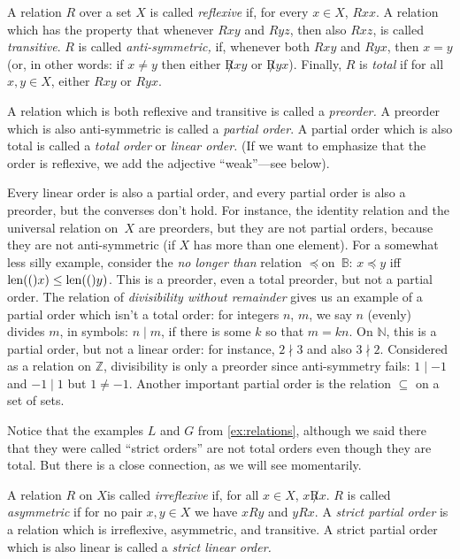 \documentclass[misc]{subfiles}
\begin{document}
\begin{defn}
A relation $R$ over a set $X$ is called \emph{reflexive} if, for
every $x\in X$, $Rxx$. A relation which has the property that whenever
$Rxy$ and $Ryz$, then also $Rxz$, is called \emph{transitive}.
$R$ is called \emph{anti-symmetric,} if, whenever both $Rxy$ and
$Ryx$, then $x=y$ (or, in other words: if $x\neq y$ then either
$\not Rxy$ or $\not Ryx$). Finally, $R$ is \emph{total} if for
all $x,y\in X$, either $Rxy$ or $Ryx$.

A relation which is both reflexive and transitive is called a \emph{preorder.}
A preorder which is also anti-symmetric is called a \emph{partial
order}. A partial order which is also total is called a \emph{total
order} or \emph{linear order.} (If we want to emphasize that the order
is reflexive, we add the adjective ``weak''---see below).
\end{defn}

\begin{ex}
Every linear order is also a partial order, and every partial order
is also a preorder, but the converses don't hold. For instance, the
identity relation and the universal relation on~$X$ are preorders, but
they are not partial orders, because they are not anti-symmetric (if
$X$ has more than one element). For a somewhat less silly example,
consider the \emph{no longer than} relation $\preccurlyeq$on~$\mathbb{B}$:
$x\preccurlyeq y$ iff $\mathrm{len}(()x)\le\mathrm{len}(()y)$. This is a preorder, even
a total preorder, but not a partial order. The relation of \emph{divisibility
without remainder} gives us an example of a partial order which isn't
a total order: for integers $n$, $m$, we say $n$ (evenly) divides
$m$, in symbols: $n\mid m$, if there is some $k$ so that $m=kn$.
On $\mathbb{N}$, this is a partial order, but not a linear order:
for instance, $2\nmid3$ and also $3\nmid2$. Considered as a relation
on $\mathbb{Z}$, divisibility is only a preorder since anti-symmetry
fails: $1\mid-1$ and $-1\mid1$ but $1\neq-1$. Another important
partial order is the relation $\subseteq$ on a set of sets.

Notice that the examples $L$ and $G$ from \ref{ex:relations},
although we said there that they were called ``strict orders'' are
not total orders even though they are total. But there is a close
connection, as we will see momentarily.
\end{ex}

\begin{defn}
A relation $R$ on $X$is called \emph{irreflexive} if, for all $x\in X$,
$x\not Rx$. $R$ is called \emph{asymmetric} if for no pair $x,y\in X$
we have $xRy$ and $yRx$. A \emph{strict partial order} is a relation
which is irreflexive, asymmetric, and transitive. A strict partial
order which is also linear is called a \emph{strict linear order.}
\end{defn}
\end{document}
